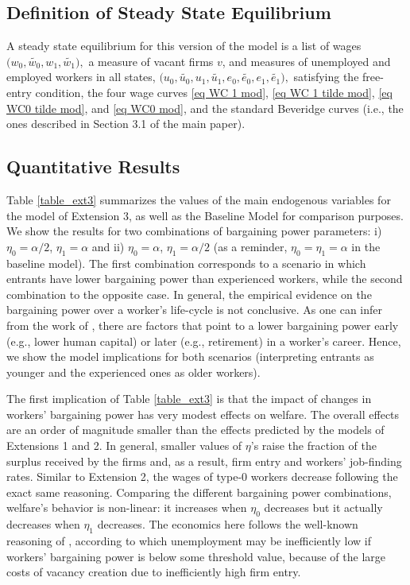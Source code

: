 \documentclass[12pt]{article} %
\theoremstyle{definition}
\begin{document}
\subsection*{Definition of Steady State Equilibrium}

\noindent A steady state equilibrium for this version of the model is a list of wages 
$
\bigl(w_0, \tilde{w_0}, w_1, \tilde{w_1}\bigr),
$
a measure of vacant firms \(v\), and measures of unemployed and employed workers in all states,
$
\bigl(u_0, \tilde{u_0}, u_1, \tilde{u_1}, e_0, \tilde{e_0}, e_1, \tilde{e_1}\bigr),
$
satisfying the free-entry condition, the four wage curves \eqref{eq WC 1 mod}, \eqref{eq WC 1 tilde mod}, \eqref{eq WC0 tilde mod}, and \eqref{eq WC0 mod}, and the standard Beveridge curves (i.e., the ones described in Section 3.1 of the main paper).


\subsection*{Quantitative Results} 

Table \ref{table_ext3} summarizes the values of the main endogenous variables for the model of Extension 3, as well as the Baseline Model for comparison purposes.
We show the results for two combinations of bargaining power parameters: i) $\eta_{0}=\alpha/2$, $\eta_{1} = \alpha$ and ii) $\eta_{0}=\alpha$, $\eta_{1} = \alpha/2$ (as a reminder, $\eta_{0}= \eta_{1} = \alpha$ in the baseline model).
The first combination corresponds to a scenario in which entrants have lower bargaining power than experienced workers,  while the second combination to the opposite case.
In general, the empirical evidence on the bargaining power over a worker's life-cycle is not conclusive.
As one can infer from the work of \cite{cordoba2023endogenous}, there are factors that point to a lower bargaining power early (e.g., lower human capital) or later (e.g., retirement) in a worker's career.
Hence, we show the model implications for both scenarios (interpreting entrants as younger and the experienced ones as older workers).

The first implication of Table \ref{table_ext3} is that the impact of changes in workers' bargaining power has very modest effects on welfare.
The overall effects are an order of magnitude smaller than the effects predicted by the models of Extensions 1 and 2.
In general, smaller values of $\eta$'s raise the fraction of the surplus received by the firms and, as a result, firm entry and workers' job-finding rates.
Similar to Extension 2, the wages of type-0 workers decrease following the exact same reasoning.
Comparing the different bargaining power combinations, welfare's behavior is non-linear: it increases when $\eta_{0}$ decreases but it actually decreases when $\eta_{1}$ decreases.
The economics here follows the well-known reasoning of \cite{hosios1990efficiency}, according to which unemployment may be inefficiently low if workers' bargaining power is below some threshold value, because of the large costs of vacancy creation due to inefficiently high firm entry.
\end{document}
